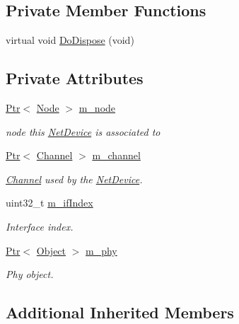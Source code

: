 \subsection*{Private Member Functions}
\begin{DoxyCompactItemize}
\item 
virtual void \hyperlink{classns3_1_1NonCommunicatingNetDevice_a442974dbc2047e601854743ea07939cb}{Do\+Dispose} (void)
\end{DoxyCompactItemize}
\subsection*{Private Attributes}
\begin{DoxyCompactItemize}
\item 
\hyperlink{classns3_1_1Ptr}{Ptr}$<$ \hyperlink{classns3_1_1Node}{Node} $>$ \hyperlink{classns3_1_1NonCommunicatingNetDevice_a04d78a4d8ab99ee0b83976fa580d07db}{m\+\_\+node}
\begin{DoxyCompactList}\small\item\em node this \hyperlink{classns3_1_1NetDevice}{Net\+Device} is associated to \end{DoxyCompactList}\item 
\hyperlink{classns3_1_1Ptr}{Ptr}$<$ \hyperlink{classns3_1_1Channel}{Channel} $>$ \hyperlink{classns3_1_1NonCommunicatingNetDevice_a55673c01c4e79cf417ca34e7d6b04737}{m\+\_\+channel}
\begin{DoxyCompactList}\small\item\em \hyperlink{classns3_1_1Channel}{Channel} used by the \hyperlink{classns3_1_1NetDevice}{Net\+Device}. \end{DoxyCompactList}\item 
uint32\+\_\+t \hyperlink{classns3_1_1NonCommunicatingNetDevice_a9788909405c07a484167d4a4f7ea8a54}{m\+\_\+if\+Index}
\begin{DoxyCompactList}\small\item\em Interface index. \end{DoxyCompactList}\item 
\hyperlink{classns3_1_1Ptr}{Ptr}$<$ \hyperlink{classns3_1_1Object}{Object} $>$ \hyperlink{classns3_1_1NonCommunicatingNetDevice_a938941e476d9d2fef73d97e7db1456b9}{m\+\_\+phy}
\begin{DoxyCompactList}\small\item\em Phy object. \end{DoxyCompactList}\end{DoxyCompactItemize}
\subsection*{Additional Inherited Members}


